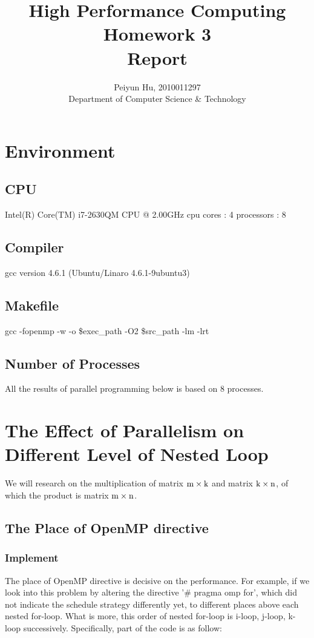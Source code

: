 \documentclass[a4paper]{article}   %
\begin{document}
\begin{CJK}{UTF8}{gbsn}
\begin{spacing}{1.2}

\title{High Performance Computing\\ Homework 3\\ Report}
\author{Peiyun Hu, 2010011297\\ Department of Computer Science \& Technology}
\maketitle

\section{Environment}
\subsection{CPU}
Intel(R) Core(TM) i7-2630QM CPU @ 2.00GHz
cpu cores	: 4
processors	: 8
\subsection{Compiler}
gcc version 4.6.1 (Ubuntu/Linaro 4.6.1-9ubuntu3)
\subsection{Makefile}
gcc -fopenmp -w -o \$exec\_path -O2 \$src\_path -lm -lrt 
\subsection{Number of Processes}
All the results of parallel programming below is based on 8 processes. 

\section{The Effect of Parallelism on Different Level of Nested Loop}
We will research on the multiplication of matrix $\text m \times \text k$ and matrix $\text k\times \text n$, of which the product is matrix $\text m\times \text n$. 

\subsection{The Place of OpenMP directive}

\subsubsection{Implement}
The place of OpenMP directive is decisive on the performance. For example, if we look into this problem by altering the directive '\# pragma omp for', which did not indicate the schedule strategy differently yet, to different places above each nested for-loop. What is more, this order of nested for-loop is i-loop, j-loop, k-loop successively. Specifically, part of the code is as follow: 


\end{spacing}
\end{CJK}
\end{document}
